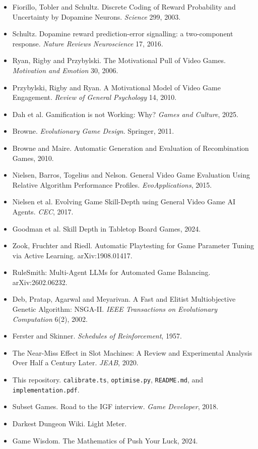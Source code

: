 \documentclass[11pt,a4paper]{article}
\begin{document}
\small
\begin{itemize}\setlength{\itemsep}{1pt}
\item Fiorillo, Tobler and Schultz. Discrete Coding of Reward Probability and Uncertainty by
Dopamine Neurons. \emph{Science} 299, 2003.
\item Schultz. Dopamine reward prediction-error signalling: a two-component response.
\emph{Nature Reviews Neuroscience} 17, 2016.
\item Ryan, Rigby and Przybylski. The Motivational Pull of Video Games. \emph{Motivation and
Emotion} 30, 2006.
\item Przybylski, Rigby and Ryan. A Motivational Model of Video Game Engagement. \emph{Review of
General Psychology} 14, 2010.
\item Dah et al. Gamification is not Working: Why? \emph{Games and Culture}, 2025.
\item Browne. \emph{Evolutionary Game Design}. Springer, 2011.
\item Browne and Maire. Automatic Generation and Evaluation of Recombination Games, 2010.
\item Nielsen, Barros, Togelius and Nelson. General Video Game Evaluation Using Relative
Algorithm Performance Profiles. \emph{EvoApplications}, 2015.
\item Nielsen et al. Evolving Game Skill-Depth using General Video Game AI Agents. \emph{CEC},
2017.
\item Goodman et al. Skill Depth in Tabletop Board Games, 2024.
\item Zook, Fruchter and Riedl. Automatic Playtesting for Game Parameter Tuning via Active
Learning. arXiv:1908.01417.
\item RuleSmith: Multi-Agent LLMs for Automated Game Balancing. arXiv:2602.06232.
\item Deb, Pratap, Agarwal and Meyarivan. A Fast and Elitist Multiobjective Genetic Algorithm:
NSGA-II. \emph{IEEE Transactions on Evolutionary Computation} 6(2), 2002.
\item Ferster and Skinner. \emph{Schedules of Reinforcement}, 1957.
\item The Near-Miss Effect in Slot Machines: A Review and Experimental Analysis Over Half a
Century Later. \emph{JEAB}, 2020.
\item This repository. \texttt{calibrate.ts}, \texttt{optimise.py}, \texttt{README.md}, and
\texttt{implementation.pdf}.
\item Subset Games. Road to the IGF interview. \emph{Game Developer}, 2018.
\item Darkest Dungeon Wiki. Light Meter.
\item Game Wisdom. The Mathematics of Push Your Luck, 2024.
\end{itemize}
\normalsize
\end{document}
